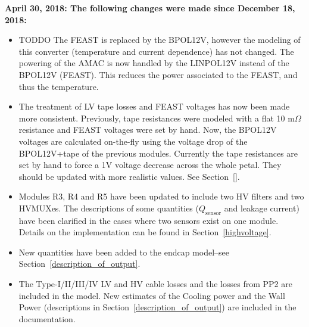 \documentclass[10pt,]{article}
\begin{document}
{ \bf
April 30, 2018: The following changes were made since December 18, 2018:}
\begin{itemize}
\item TODDO The FEAST is replaced by the BPOL12V, however the modeling of this converter (temperature
  and current dependence) has not changed. The powering of the AMAC is now handled by the LINPOL12V
  instead of the BPOL12V (FEAST). This reduces the power associated to the FEAST, and thus the
  temperature.
\item The treatment of LV tape losses and FEAST voltages has now been made more consistent. Previously,
  tape resistances were modeled with a flat 10 m$\Omega$ resistance and FEAST voltages were set by hand.
  Now, the BPOL12V voltages are calculated on-the-fly using the voltage drop of the BPOL12V+tape of
  the previous modules. Currently the tape resistances are set by hand to force a 1V voltage decrease
  across the whole petal. They should be updated with more realistic values. See Section~\ref{}.
\item Modules R3, R4 and R5 have been updated to include two HV filters and two HVMUXes. The descriptions
  of some quantities ($Q_\text{sensor}$ and leakage current) have been clarified in the cases where two sensors
  exist on one module. Details on the implementation can be found in Section~\ref{highvoltage}.
\item New quantities have been added to the endcap model--see Section~\ref{description_of_output}.
\item The Type-I/II/III/IV LV and HV cable losses and the losses from PP2 are included in the model. New
  estimates of the Cooling power and the Wall Power (descriptions in Section~\ref{description_of_output})
  are included in the documentation.
\end{itemize}




\clearpage

\clearpage


\clearpage

\clearpage

\clearpage
\begin{appendices}

\end{appendices}
\end{document}
